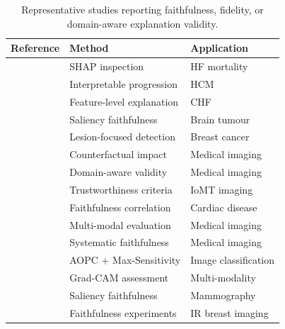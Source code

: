 \begin{table}[htbp]
\centering
\caption{Representative studies reporting faithfulness, fidelity, or domain-aware explanation validity.}
\label{tab:faithfulness_metrics}
\small
\begin{tabularx}{\columnwidth}{@{}p{1.8cm}XX@{}}
\toprule
\textbf{Reference} & \textbf{Method} & \textbf{Application} \\
\midrule
\cite{Vazquez2021} & SHAP inspection & HF mortality \\
\cite{Piculin2022} & Interpretable progression & HCM \\
\cite{Li2020} & Feature-level explanation & CHF \\
\cite{Nazir2024UtilizingCC} & Saliency faithfulness & Brain tumour \\
\cite{saharan2025explainable} & Lesion-focused detection & Breast cancer \\
\cite{lenis2020domain} & Counterfactual impact & Medical imaging \\
\cite{10051650} & Domain-aware validity & Medical imaging \\
\cite{10328849} & Trustworthiness criteria & IoMT imaging \\
\cite{Pandey2024} & Faithfulness correlation & Cardiac disease \\
\cite{jin2022evaluating} & Multi-modal evaluation & Medical imaging \\
\cite{lamprou2024evaluation} & Systematic faithfulness & Medical imaging \\
\cite{Patricio2024} & AOPC + Max-Sensitivity & Image classification \\
\cite{chien2022usefulness} & Grad-CAM assessment & Multi-modality \\
\cite{cerekci2024quantitative} & Saliency faithfulness & Mammography \\
\cite{raghavan2024explainable} & Faithfulness experiments & IR breast imaging \\
\bottomrule
\end{tabularx}
\end{table}
